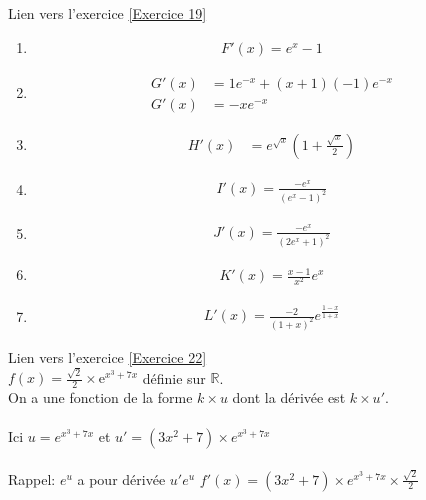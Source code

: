 \documentclass[12pt,fleqn]{report} %
\begin{document}
\begin{correction}Lien vers l'exercice   \ref{Exercice 19}
	\begin{enumerate}
		\item 
		
		\begin{align*}
		F'(x)=e^x-1
		\end{align*}
		\item
		\begin{align*}
		G'(x)& = 1e^{-x}+(x+1)(-1)e^{-x}\\
		G'(x)& =-xe^{-x}
		\end{align*}
		\item
		\begin{align*}
		H'(x)& =e^{\sqrt x}\left(1+\frac{\sqrt x}{2}\right)
		\end{align*}
		\item
		\begin{align*}
		I'(x)=\frac{-e^x}{(e^x-1)^2}
		\end{align*}
		\item
		\begin{align*}
		J'(x)=\frac{-e^x}{(2e^x+1)^2}
		\end{align*}
		\item
		\begin{align*}
		K'(x)= \frac{x-1}{x^2}e^x
		\end{align*}
		\item
		\begin{align*}
		L'(x)=\frac{-2}{(1+x)^2}e^{\frac{1-x}{1+x}}
		\end{align*}
	\end{enumerate}
\end{correction}

\begin{correction}Lien vers l'exercice   \ref{Exercice 22}\\
	$f(x)=\frac{\sqrt{2}}{2}\times\text{e}^{x^3+7x}$ définie sur $\mathbb{R}$. \\
	On a une fonction de la forme $k\times u$ dont la dérivée est $k\times u'$. \\ \\
	Ici \qquad $u=e^{x^3+7x}$ \qquad et $u'=(3x^2+7)\times e^{x^3+7x}$ \\ \\
	Rappel: \qquad $e^{u}$ a pour dérivée $u'e^{u}$
	\newline\newline $f'(x)=(3x^2+7)\times{e}^{x^3+7x}\times\frac{\sqrt{2}}{2}$\newline
	\begin{center}
	\end{center}
\end{correction}
\end{document}
